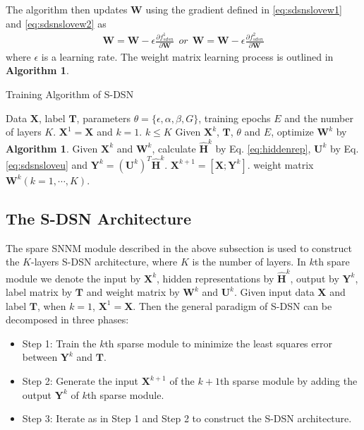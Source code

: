 \documentclass[letterpaper]{article}
\begin{document}
The algorithm then updates $\textbf{W}$ using the gradient defined in \eqref{eq:sdsnslovew1} and \eqref{eq:sdsnslovew2} as
\begin{align}
\textbf{W}=\textbf{W}-\epsilon \frac{\partial f^1_{sdsn} }{\partial \textbf{W}} \ \
or \ \ \textbf{W}=\textbf{W}-\epsilon \frac{\partial f^2_{sdsn} }{\partial \textbf{W}}
\label{eq:sdsnupdataw}
\end{align}
where $\epsilon$ is a learning rate. The weight matrix learning process is outlined in \textbf{Algorithm 1}. %

\begin{algorithm}[tb]
\caption{Training Algorithm of S-DSN}
\begin{algorithmic}[1]
 Data $\textbf{X}$, label $\textbf{T}$, parameters $\theta=\{\epsilon, \alpha, \beta, G\}$, training epochs $E$ and the number of layers $K$.
\State{\bfseries Initialize:} $\textbf{X}^1=\textbf{X}$ and $k=1$.
\State{\bfseries while} $k\leq K$
\State  Given $\textbf{X}^k$, $\textbf{T}$, $\theta$ and $E$, optimize $\textbf{W}^k$ by \textbf{Algorithm 1}.
\State  Given $\textbf{X}^k$ and $\textbf{W}^k$, calculate $\widehat{\textbf{H}}^k$ by Eq. \eqref{eq:hiddenrep}, $\textbf{U}^k$ by Eq. \eqref{eq:sdsnsloveu} and $\textbf{Y}^k=\left(\textbf{U}^k\right)^T\widehat{\textbf{H}}^k$.
\State $\textbf{X}^{k+1}=[\textbf{X}; \textbf{Y}^k]$.
 weight matrix $\textbf{W}^k(k=1,\cdots,K)$.
\end{algorithmic}
\label{alg:TrainalgS-DSN}
\vskip -0.05in
\end{algorithm}


\subsection{The S-DSN Architecture}
The spare SNNM module described in the above subsection is used to construct the $K$-layers S-DSN architecture, where $K$ is the number of layers. In $k$th spare module we denote the input by $\textbf{X}^k$, hidden representations by $\widehat{\textbf{H}}^k$, output by $\textbf{Y}^k$, label matrix by $\textbf{T}$ and weight matrix by $\textbf{W}^k$ and $\textbf{U}^k$. Given input data $\textbf{X}$ and label $\textbf{T}$, when $k=1$, $\textbf{X}^1=\textbf{X}$. Then the general paradigm of S-DSN can be decomposed in three phases:
\begin{itemize}
  \item Step 1: Train the $k$th sparse module to minimize the least squares error between $\textbf{Y}^k$ and $\textbf{T}$.
  \item Step 2: Generate the input $\textbf{X}^{k+1}$ of the $k+1$th sparse module by adding the output $\textbf{Y}^k$ of $k$th sparse module.
  \item Step 3: Iterate as in Step 1 and Step 2 to construct the S-DSN architecture.
\end{itemize}
\end{document}
